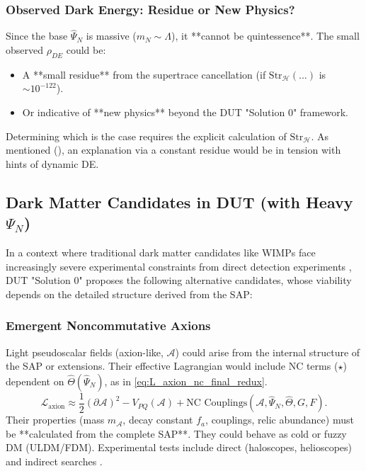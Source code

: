 \documentclass[11pt, a4paper]{article}
\theoremstyle{remark}
\newcommand{\Op}[1]{\hat{#1}}
\newcommand{\Str}{\mathrm{Str}}
\begin{document}
\subsubsection{Observed Dark Energy: Residue or New Physics?}
\label{sec:observed_dark_energy_revised}
Since the base \( \Op{\Psi}_N \) is massive (\( m_N \sim \Lambda \)), it **cannot be quintessence**. The small observed \( \rho_{DE} \) could be:
\begin{itemize}
    \item A **small residue** from the supertrace cancellation (if \( \Str_{\mathcal{H}}(...) \) is \( \sim 10^{-122} \)).
    \item Or indicative of **new physics** beyond the DUT "Solution 0" framework.
\end{itemize}
Determining which is the case requires the explicit calculation of \( \Str_{\mathcal{H}} \). As mentioned (), an explanation via a constant residue would be in tension with hints of dynamic DE.

\subsection{Dark Matter Candidates in DUT (with Heavy \texorpdfstring{$\Psi_N$}{PsiN})}
\label{subsec:dark_matter_final_revised}

In a context where traditional dark matter candidates like WIMPs face increasingly severe experimental constraints from direct detection experiments \citep[see summary in][]{PDG2022}, DUT "Solution 0" proposes the following alternative candidates, whose viability depends on the detailed structure derived from the SAP:

\subsubsection{Emergent Noncommutative Axions}
\label{sec:axiones_nc_final_revised}
Light pseudoscalar fields (axion-like, \( \mathcal{A} \)) could arise from the internal structure of the SAP or extensions. Their effective Lagrangian would include NC terms (\( \star \)) dependent on \( \Op{\Theta}(\Op{\Psi}_N) \), as in \eqref{eq:L_axion_nc_final_redux}.
\begin{equation} \label{eq:L_axion_nc_final_redux}
\mathcal{L}_{\text{axion}} \approx \frac{1}{2} (\partial \mathcal{A})^2 - V_{PQ}(\mathcal{A}) + \text{NC Couplings}(\mathcal{A}, \Op{\Psi}_N, \Op{\Theta}, G, F).
\end{equation}
Their properties (mass \( m_{\mathcal{A}} \), decay constant \( f_a \), couplings, relic abundance) must be **calculated from the complete SAP**. They could behave as cold or fuzzy DM (ULDM/FDM). Experimental tests include direct (haloscopes, helioscopes) and indirect searches \citep{PDG2022, PerezGarcia2024}. %
\end{document}
